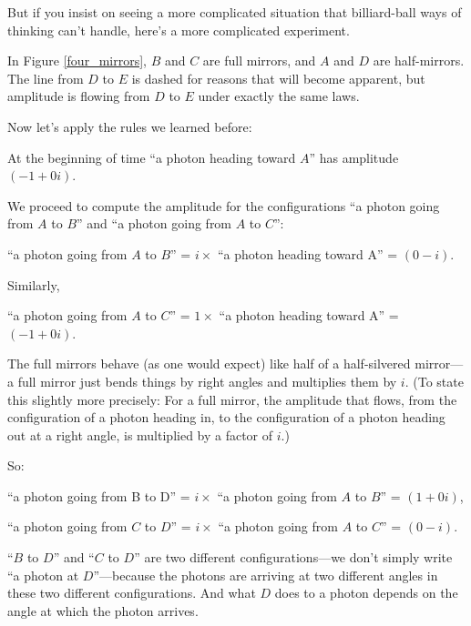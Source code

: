 {
 But if you insist on seeing a more complicated situation that
billiard-ball ways of thinking can't handle,
here's a more complicated experiment.}


{
 In Figure \ref{four_mirrors}, $B$ and $C$ are full mirrors, and $A$ and $D$ are
half-mirrors. The line from $D$ to $E$ is dashed for reasons that will
become apparent, but amplitude is flowing from $D$ to $E$ under exactly the
same laws.}

{
 Now let's apply the rules we learned before:}

{
 At the beginning of time ``a photon heading
toward $A$'' has amplitude $(-1 + 0i)$.}

{
 We proceed to compute the amplitude for the configurations
``a photon going from $A$ to $B$'' and
``a photon going from $A$ to $C$'':}

{\centering
 ``a photon going from $A$ to $B$''
= $i \times$ ``a photon heading toward
A'' = $(0 - i)$.
\par}


{
 Similarly,}

{\centering
 ``a photon going from $A$ to $C$''
= $1 \times$ ``a photon heading toward
A'' = $(-1 + 0i)$.
\par}


{
 The full mirrors behave (as one would expect) like half of a
half-silvered mirror---a full mirror just bends things by right angles
and multiplies them by $i$. (To state this slightly more precisely: For a
full mirror, the amplitude that flows, from the configuration of a
photon heading in, to the configuration of a photon heading out at a
right angle, is multiplied by a factor of $i$.)}

{
 So:}

{\centering
 ``a photon going from B to D''
= $i \times$ ``a photon going from $A$ to
$B$'' = $(1 + 0i)$,
\par}


{\centering
 ``a photon going from $C$ to $D$''
= $i \times$ ``a photon going from $A$ to
$C$'' = $(0 - i)$.
\par}


{
 ``$B$ to $D$'' and
``$C$ to $D$'' are two different
configurations---we don't simply write
``a photon at $D$''---because the
photons are arriving at two different angles in these two different
configurations. And what $D$ does to a photon depends on the angle at
which the photon arrives.}

